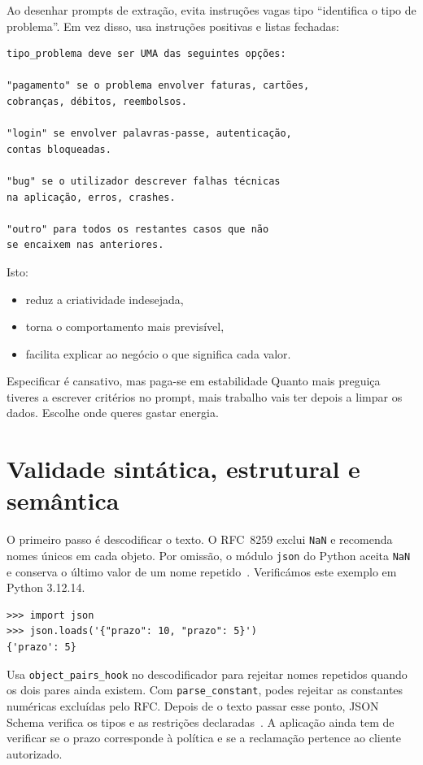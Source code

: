 Ao desenhar prompts de extração, evita instruções vagas tipo “identifica o tipo de problema”. Em vez disso, usa instruções positivas e listas fechadas:

\begin{lstlisting}
tipo_problema deve ser UMA das seguintes opções:

"pagamento" se o problema envolver faturas, cartões,
cobranças, débitos, reembolsos.

"login" se envolver palavras-passe, autenticação,
contas bloqueadas.

"bug" se o utilizador descrever falhas técnicas
na aplicação, erros, crashes.

"outro" para todos os restantes casos que não
se encaixem nas anteriores.
\end{lstlisting}

Isto:

\begin{itemize}[leftmargin=*]
\item reduz a criatividade indesejada,
\item torna o comportamento mais previsível,
\item facilita explicar ao negócio o que significa cada valor.
\end{itemize}

\begin{keyideabox}{Especificar é cansativo, mas paga-se em estabilidade}
Quanto mais preguiça tiveres a escrever critérios no prompt, mais trabalho vais ter depois a limpar os dados. Escolhe onde queres gastar energia.
\end{keyideabox}

\section{Validade sintática, estrutural e semântica}
\label{sec:validacao-json}
O primeiro passo é descodificar o texto. O RFC~8259 exclui \texttt{NaN} e recomenda nomes únicos em cada objeto. Por omissão, o módulo \texttt{json} do Python aceita \texttt{NaN} e conserva o último valor de um nome repetido~\citep{rfc8259,pythonjson312}. Verificámos este exemplo em Python 3.12.14.

\begin{lstlisting}
>>> import json
>>> json.loads('{"prazo": 10, "prazo": 5}')
{'prazo': 5}
\end{lstlisting}

Usa \texttt{object\_pairs\_hook} no descodificador para rejeitar nomes repetidos quando os dois pares ainda existem. Com \texttt{parse\_constant}, podes rejeitar as constantes numéricas excluídas pelo RFC. Depois de o texto passar esse ponto, JSON Schema verifica os tipos e as restrições declaradas~\citep{jsonschema2020}. A aplicação ainda tem de verificar se o prazo corresponde à política e se a reclamação pertence ao cliente autorizado.


